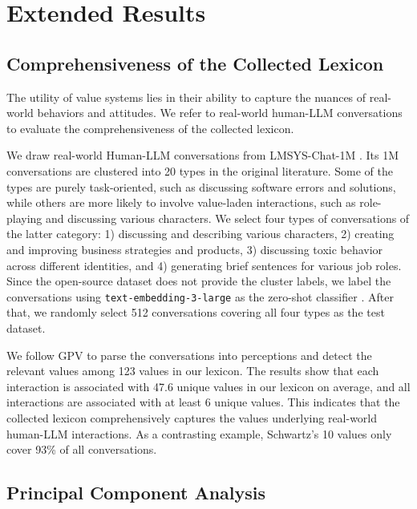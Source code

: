 \section{Extended Results}

\subsection{Comprehensiveness of the Collected Lexicon}
\label{app:comprehensiveness}

The utility of value systems lies in their ability to capture the nuances of real-world behaviors and attitudes. We refer to real-world human-LLM conversations to evaluate the comprehensiveness of the collected lexicon. 

We draw real-world Human-LLM conversations from LMSYS-Chat-1M \cite{zheng2023lmsyschat1m}. Its 1M conversations are clustered into 20 types in the original literature. Some of the types are purely task-oriented, such as discussing software errors and solutions, while others are more likely to involve value-laden interactions, such as role-playing and discussing various characters. We select four types of conversations of the latter category: 1) discussing and describing various characters, 2) creating and improving business strategies and products, 3) discussing toxic behavior across different identities, and 4) generating brief sentences for various job roles. Since the open-source dataset does not provide the cluster labels, we label the conversations using \texttt{text-embedding-3-large} as the zero-shot classifier \cite{openai2024textembedding3large}. After that, we randomly select 512 conversations covering all four types as the test dataset.

We follow GPV \cite{ye2025gpv} to parse the conversations into perceptions and detect the relevant values among 123 values in our lexicon. The results show that each interaction is associated with 47.6 unique values in our lexicon on average, and all interactions are associated with at least 6 unique values. This indicates that the collected lexicon comprehensively captures the values underlying real-world human-LLM interactions. As a contrasting example, Schwartz's 10 values only cover 93\% of all conversations.


\subsection{Principal Component Analysis}
\label{app:pca}

